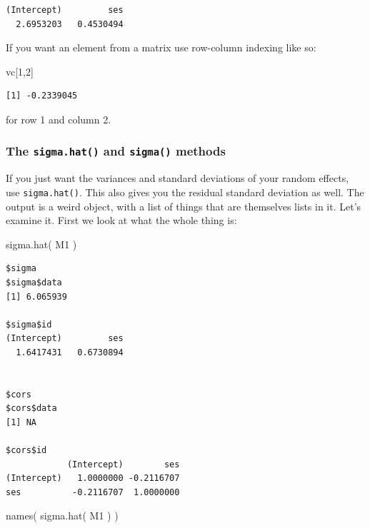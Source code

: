 \documentclass[
  letterpaper,
  DIV=11,
  numbers=noendperiod]{scrreprt}
\newenvironment{Shaded}{}{}
\newcommand{\DecValTok}[1]{\textcolor[rgb]{0.25,0.63,0.44}{#1}}
\newcommand{\FunctionTok}[1]{\textcolor[rgb]{0.02,0.16,0.49}{#1}}
\newcommand{\NormalTok}[1]{#1}
\begin{document}
\begin{verbatim}
(Intercept)         ses 
  2.6953203   0.4530494 
\end{verbatim}

If you want an element from a matrix use row-column indexing like so:

\begin{Shaded}
\begin{Highlighting}[]
\NormalTok{vc[}\DecValTok{1}\NormalTok{,}\DecValTok{2}\NormalTok{]}
\end{Highlighting}
\end{Shaded}

\begin{verbatim}
[1] -0.2339045
\end{verbatim}

for row 1 and column 2.

\subsubsection{\texorpdfstring{The \texttt{sigma.hat()} and
\texttt{sigma()}
methods}{The sigma.hat() and sigma() methods}}\label{the-sigma.hat-and-sigma-methods}

If you just want the variances and standard deviations of your random
effects, use \texttt{sigma.hat()}. This also gives you the residual
standard deviation as well. The output is a weird object, with a list of
things that are themselves lists in it. Let's examine it. First we look
at what the whole thing is:

\begin{Shaded}
\begin{Highlighting}[]
\FunctionTok{sigma.hat}\NormalTok{( M1 )}
\end{Highlighting}
\end{Shaded}

\begin{verbatim}
$sigma
$sigma$data
[1] 6.065939

$sigma$id
(Intercept)         ses 
  1.6417431   0.6730894 


$cors
$cors$data
[1] NA

$cors$id
            (Intercept)        ses
(Intercept)   1.0000000 -0.2116707
ses          -0.2116707  1.0000000
\end{verbatim}

\begin{Shaded}
\begin{Highlighting}[]
\FunctionTok{names}\NormalTok{( }\FunctionTok{sigma.hat}\NormalTok{( M1 ) )}
\end{Highlighting}
\end{Shaded}
\end{document}
